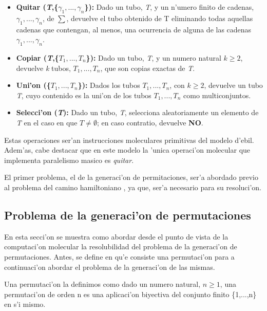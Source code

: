 \documentclass[12pt]{article}
\begin{document}
\begin{itemize}
    \item \textbf{Quitar (\textit{T},\{$ \gamma_{1},...,\gamma_{n} $\}):} Dado un tubo, \textit{T}, y un n'umero finito
    de cadenas, $ \gamma_{1},...,\gamma_{n} $, de $ \sum $, devuelve el tubo obtenido de T eliminando
    todas aquellas cadenas que contengan, al menos, una ocurrencia de alguna de las cadenas
    $ \gamma_{1},...,\gamma_{n} $.
    \item \textbf{Copiar (\textit{T},\{$ \textit{T}_{1},...,\textit{T}_{n} $\}):} Dado un tubo, \textit{T}, y un numero
    natural $ \textit{k} \geq 2 $, devuelve \textit{k} tubos, $\textit{T}_{1},...,\textit{T}_{n}$, que son
    copias exactas de \textit{T}.
    \item \textbf{Uni'on (\{$ \textit{T}_{1},...,\textit{T}_{n} $\}):} Dados los tubos
    $\textit{T}_{1},...,\textit{T}_{n}$, con $ \textit{k} \geq 2 $, devuelve un tubo \textit{T}, cuyo contenido
    es la uni'on de los tubos $\textit{T}_{1},...,\textit{T}_{n}$ como multiconjuntos.
    \item \textbf{Selecci'on (\textit{T}):} Dado un tubo, \textit{T}, selecciona aleatoriamente un elemento de \textit{T}
    en el caso en que $\textit{T} \neq \emptyset$; en caso contratio, devuelve \textbf{NO}.
\end{itemize}

Estas operaciones ser'an instrucciones moleculares primitivas del modelo d'ebil. Adem'as, cabe destacar que
en este modelo la 'unica operaci'on molecular que implementa paralelismo masico es \textit{quitar}.

El primer problema, el de la generaci'on de permitaciones, ser'a abordado previo al problema del camino hamiltoniano
, ya que, ser'a necesario para su resoluci'on.

\subsection{Problema de la generaci'on de permutaciones}

En esta secci'on se muestra como abordar desde el punto de vista de la computaci'on molecular la resolubilidad
del problema de la generaci'on de permutaciones. Antes, se define en qu'e consiste una permutaci'on para a
continuaci'on abordar el problema de la generaci'on de las mismas.

Una permutaci'on la definimos como dado un numero natural, $n \geq 1$, una permutaci'on de orden n es una
aplicaci'on biyectiva del conjunto finito \{1,...,n\} en s'i mismo.
\end{document}
